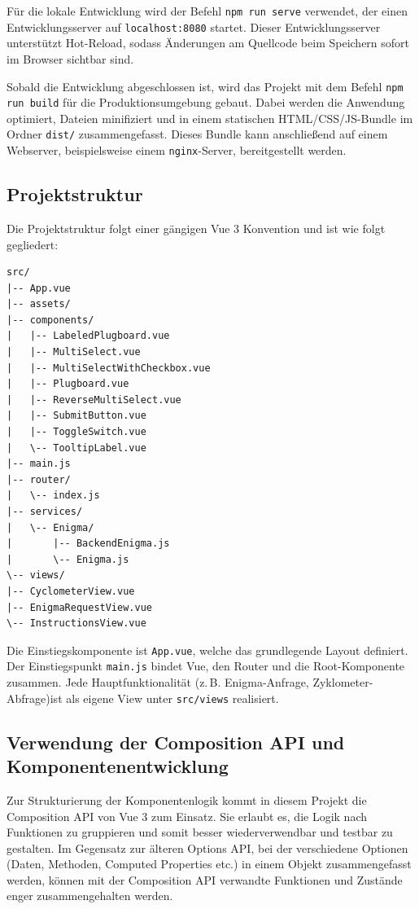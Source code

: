 \documentclass[12pt, ngerman, a4paper, numbers=noenddot]{article}
\begin{document}
Für die lokale Entwicklung wird der Befehl \lstinline|npm run serve| verwendet, der einen Entwicklungsserver auf \lstinline|localhost:8080| startet. Dieser Entwicklungsserver unterstützt Hot-Reload, sodass Änderungen am Quellcode beim Speichern sofort im Browser sichtbar sind.

Sobald die Entwicklung abgeschlossen ist, wird das Projekt mit dem Befehl \lstinline|npm run build| für die Produktionsumgebung gebaut. Dabei werden die Anwendung optimiert, Dateien minifiziert und in einem statischen HTML/CSS/JS-Bundle im Ordner \lstinline|dist/| zusammengefasst. Dieses Bundle kann anschließend auf einem Webserver, beispielsweise einem \lstinline|nginx|-Server, bereitgestellt werden.

\newpage
\subsection{Projektstruktur}

Die Projektstruktur folgt einer gängigen Vue 3 Konvention und ist wie folgt gegliedert:

\begin{lstlisting}[language=folderstructure, caption=Projektstruktur]
src/
|-- App.vue
|-- assets/
|-- components/
|   |-- LabeledPlugboard.vue
|   |-- MultiSelect.vue
|   |-- MultiSelectWithCheckbox.vue
|   |-- Plugboard.vue
|   |-- ReverseMultiSelect.vue
|   |-- SubmitButton.vue
|   |-- ToggleSwitch.vue
|   \-- TooltipLabel.vue
|-- main.js
|-- router/
|   \-- index.js
|-- services/
|   \-- Enigma/
|       |-- BackendEnigma.js
|       \-- Enigma.js
\-- views/
|-- CyclometerView.vue
|-- EnigmaRequestView.vue
\-- InstructionsView.vue
\end{lstlisting}


Die Einstiegskomponente ist \lstinline|App.vue|, welche das grundlegende Layout definiert. Der Einstiegspunkt \lstinline|main.js| bindet Vue, den Router und die Root-Komponente zusammen. Jede Hauptfunktionalität (z.\,B. Enigma-Anfrage,  Zyklometer-Abfrage)\newline ist als eigene View unter \lstinline|src/views| realisiert.

\subsection{Verwendung der Composition API und Komponentenentwicklung}

Zur Strukturierung der Komponentenlogik kommt in diesem Projekt die Composition API von Vue 3 zum Einsatz. Sie erlaubt es, die Logik nach Funktionen zu gruppieren und somit besser wiederverwendbar und testbar zu gestalten. Im Gegensatz zur älteren Options API, bei der verschiedene Optionen (Daten, Methoden, Computed Properties etc.) in einem Objekt zusammengefasst werden, können mit der Composition API verwandte Funktionen und Zustände enger zusammengehalten werden.
\end{document}
